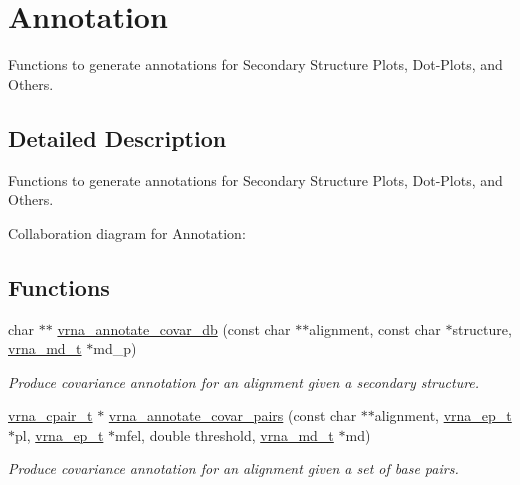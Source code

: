 \hypertarget{group__annotation__utils}{}\section{Annotation}
\label{group__annotation__utils}


Functions to generate annotations for Secondary Structure Plots, Dot-\/\+Plots, and Others.  




\subsection{Detailed Description}
Functions to generate annotations for Secondary Structure Plots, Dot-\/\+Plots, and Others. 

Collaboration diagram for Annotation\+:
\subsection*{Functions}
\begin{DoxyCompactItemize}
\item 
char $\ast$$\ast$ \mbox{\hyperlink{group__annotation__utils_ga01fad860df6c799264d1186c343b1d29}{vrna\+\_\+annotate\+\_\+covar\+\_\+db}} (const char $\ast$$\ast$alignment, const char $\ast$structure, \mbox{\hyperlink{group__model__details_ga1f8a10e12a0a1915f2a4eff0b28ea17c}{vrna\+\_\+md\+\_\+t}} $\ast$md\+\_\+p)
\begin{DoxyCompactList}\small\item\em Produce covariance annotation for an alignment given a secondary structure. \end{DoxyCompactList}\item 
\mbox{\hyperlink{group__data__structures_gae4fc91141cc69c6d8eaf1332cb991ecc}{vrna\+\_\+cpair\+\_\+t}} $\ast$ \mbox{\hyperlink{group__annotation__utils_gadb9ba32197f05d5876d389b2ba92edac}{vrna\+\_\+annotate\+\_\+covar\+\_\+pairs}} (const char $\ast$$\ast$alignment, \mbox{\hyperlink{group__struct__utils__plist_gab9ac98ab55ded9fb90043b024b915aca}{vrna\+\_\+ep\+\_\+t}} $\ast$pl, \mbox{\hyperlink{group__struct__utils__plist_gab9ac98ab55ded9fb90043b024b915aca}{vrna\+\_\+ep\+\_\+t}} $\ast$mfel, double threshold, \mbox{\hyperlink{group__model__details_ga1f8a10e12a0a1915f2a4eff0b28ea17c}{vrna\+\_\+md\+\_\+t}} $\ast$md)
\begin{DoxyCompactList}\small\item\em Produce covariance annotation for an alignment given a set of base pairs. \end{DoxyCompactList}\end{DoxyCompactItemize}


